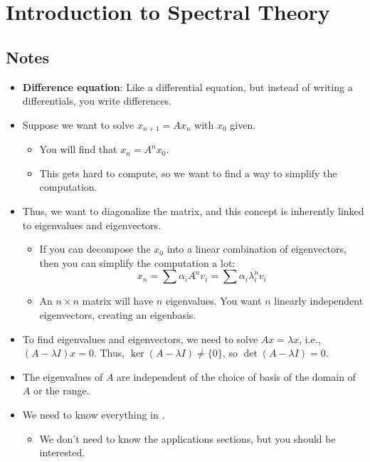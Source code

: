 \documentclass[../../notes.tex]{subfiles}
\begin{document}
\chapter{Introduction to Spectral Theory}
\section{Notes}
\begin{itemize}
    \item {}\textbf{Difference equation}: Like a differential equation, but instead of writing a differentials, you write differences.
    \item Suppose we want to solve $x_{n+1}=Ax_n$ with $x_0$ given.
    \begin{itemize}
        \item You will find that $x_n=A^nx_0$.
        \item This gets hard to compute, so we want to find a way to simplify the computation.
    \end{itemize}
    \item Thus, we want to diagonalize the matrix, and this concept is inherently linked to eigenvalues and eigenvectors.
    \begin{itemize}
        \item If you can decompose the $x_0$ into a linear combination of eigenvectors, then you can simplify the computation a lot:
        \begin{equation*}
            x_n = \sum\alpha_iA^nv_i = \sum\alpha_i\lambda_i^nv_i
        \end{equation*}
        \item An $n\times n$ matrix will have $n$ eigenvalues. You want $n$ linearly independent eigenvectors, creating an eigenbasis.
    \end{itemize}
    \item To find eigenvalues and eigenvectors, we need to solve $Ax=\lambda x$, i.e., $(A-\lambda I)x=0$. Thus, $\ker(A-\lambda I)\neq\{0\}$, so $\det(A-\lambda I)=0$.
    \item The eigenvalues of $A$ are independent of the choice of basis of the domain of $A$ or the range.
    \item {}We need to know everything in \textcite{bib:Treil}.
    \begin{itemize}
        \item We don't need to know the applications sections, but you should be interested.
    \end{itemize}

\end{itemize}
\end{document}
